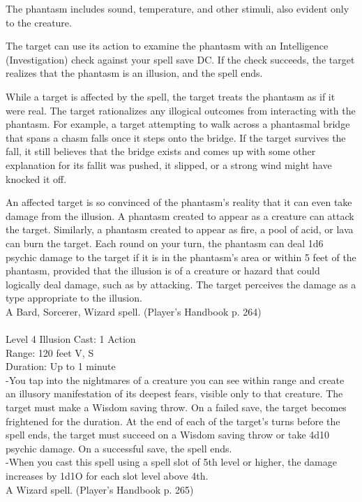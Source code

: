 \documentclass[10pt,twocolumn]{report}
\begin{document}
The phantasm includes sound, temperature, and other stimuli, also evident only to the creature.

The target can use its action to examine the phantasm with an Intelligence (Investigation) check against your spell save DC. If the check succeeds, the target realizes that the phantasm is an illusion, and the spell ends.

While a target is affected by the spell, the target treats the phantasm as if it were real. The target rationalizes any illogical outcomes from interacting with the phantasm. For example, a target attempting to walk across a phantasmal bridge that spans a chasm falls once it steps onto the bridge. If the target survives the fall, it still believes that the bridge exists and comes up with some other explanation for its fallit was pushed, it slipped, or a strong wind might have knocked it off.

An affected target is so convinced of the phantasm’s reality that it can even take damage from the illusion. A phantasm created to appear as a creature can attack the target. Similarly, a phantasm created to appear as fire, a pool of acid, or lava can burn the target. Each round on your turn, the phantasm can deal 1d6 psychic damage to the target if it is in the phantasm’s area or within 5 feet of the phantasm, provided that the illusion is of a creature or hazard that could logically deal damage, such as by attacking. The target perceives the damage as a type appropriate to the illusion.\\
A Bard, Sorcerer, Wizard spell. (Player's Handbook p. 264) \\


 \\
Level 4 \quad Illusion \quad Cast: 1 Action\\
Range: 120 feet \quad V, S\\
Duration: Up to 1 minute \quad \\
-You tap into the nightmares of a creature you can see within range and create an illusory manifestation of its deepest fears, visible only to that creature.
The target must make a Wisdom saving throw. On a failed save, the target becomes frightened for the duration. At the end of each of the target’s turns before the spell ends, the target must succeed on a Wisdom saving throw or take 4d10 psychic damage. On a successful save, the spell ends.\\
-When you cast this spell using a spell slot of 5th level or higher, the damage increases by 1d1O for each slot level above 4th.\\
A Wizard spell. (Player's Handbook p. 265) \\
\end{document}
